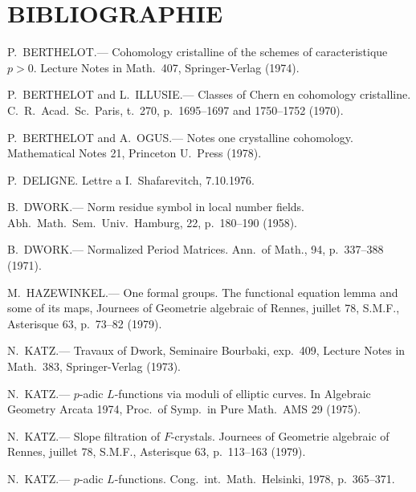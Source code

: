 \documentclass[12pt,a4paper]{article}
\theoremstyle{plain}
\theoremstyle{definition}
\theoremstyle{remark}
\begin{document}
\section*{BIBLIOGRAPHIE}

\begin{enumerate}[label={[\arabic*]}, leftmargin=2em, itemsep=0.5ex]
\item P.\ BERTHELOT.--- Cohomology cristalline of the schemes of caracteristique $p > 0$. Lecture Notes in Math.\ 407, Springer-Verlag (1974).

\item P.\ BERTHELOT and L.\ ILLUSIE.--- Classes of Chern en cohomology cristalline. C.\ R.\ Acad.\ Sc.\ Paris, t.\ 270, p.\ 1695--1697 and 1750--1752 (1970).

\item P.\ BERTHELOT and A.\ OGUS.--- Notes one crystalline cohomology. Mathematical Notes 21, Princeton U.\ Press (1978).

\item P.\ DELIGNE. Lettre a I.\ Shafarevitch, 7.10.1976.

\item B.\ DWORK.--- Norm residue symbol in local number fields. Abh.\ Math.\ Sem.\ Univ.\ Hamburg, 22, p.\ 180--190 (1958).

\item B.\ DWORK.--- Normalized Period Matrices. Ann.\ of Math., 94, p.\ 337--388 (1971).

\item M.\ HAZEWINKEL.--- One formal groups. The functional equation lemma and some of its maps, Journees of Geometrie algebraic of Rennes, juillet 78, S.M.F., Asterisque 63, p.\ 73--82 (1979).

\item N.\ KATZ.--- Travaux of Dwork, Seminaire Bourbaki, exp.\ 409, Lecture Notes in Math.\ 383, Springer-Verlag (1973).

\item N.\ KATZ.--- $p$-adic $L$-functions via moduli of elliptic curves. In Algebraic Geometry Arcata 1974, Proc.\ of Symp.\ in Pure Math.\ AMS 29 (1975).

\item N.\ KATZ.--- Slope filtration of $F$-crystals. Journees of Geometrie algebraic of Rennes, juillet 78, S.M.F., Asterisque 63, p.\ 113--163 (1979).

\item N.\ KATZ.--- $p$-adic $L$-functions. Cong.\ int.\ Math.\ Helsinki, 1978, p.\ 365--371.


\end{enumerate}
\end{document}
